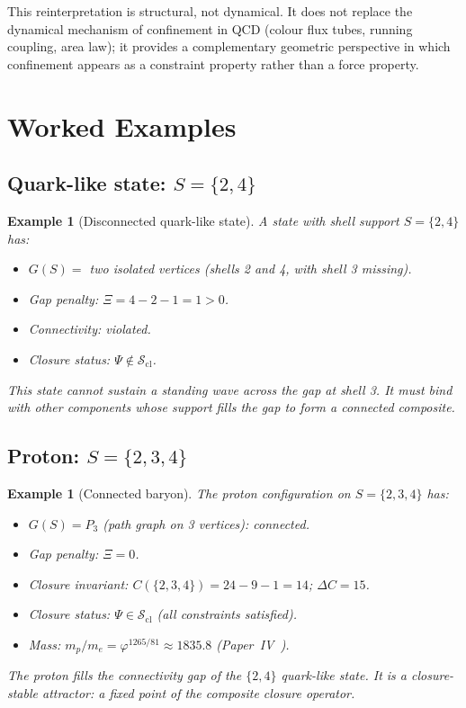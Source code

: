 \documentclass[12pt]{article}
\newtheorem{example}[theorem]{Example}
\newcommand{\Scl}{\mathcal{S}_{\mathrm{cl}}}
\newcommand{\phig}{\varphi}
\begin{document}
This reinterpretation is structural, not dynamical. It does not replace the dynamical mechanism of confinement in QCD (colour flux tubes, running coupling, area law); it provides a complementary geometric perspective in which confinement appears as a constraint property rather than a force property.

\section{Worked Examples}\label{sec:examples}

\subsection{Quark-like state: $S = \{2,4\}$}

\begin{example}[Disconnected quark-like state]\label{ex:quark}
A state with shell support $S = \{2,4\}$ has:
\begin{itemize}
    \item $G(S) = $ two isolated vertices (shells 2 and 4, with shell 3 missing).
    \item Gap penalty: $\Xi = 4 - 2 - 1 = 1 > 0$.
    \item Connectivity: violated.
    \item Closure status: $\Psi \notin \Scl$.
\end{itemize}
This state cannot sustain a standing wave across the gap at shell 3. It must bind with other components whose support fills the gap to form a connected composite.
\end{example}

\subsection{Proton: $S = \{2,3,4\}$}

\begin{example}[Connected baryon]\label{ex:proton}
The proton configuration on $S = \{2,3,4\}$ has:
\begin{itemize}
    \item $G(S) = P_3$ (path graph on 3 vertices): connected.
    \item Gap penalty: $\Xi = 0$.
    \item Closure invariant: $C(\{2,3,4\}) = 24 - 9 - 1 = 14$; $\Delta C = 15$.
    \item Closure status: $\Psi \in \Scl$ (all constraints satisfied).
    \item Mass: $m_p/m_e = \phig^{1265/81} \approx 1835.8$ (Paper~IV~\citep{SmartIV}).
\end{itemize}
The proton fills the connectivity gap of the $\{2,4\}$ quark-like state. It is a closure-stable attractor: a fixed point of the composite closure operator.
\end{example}
\end{document}
